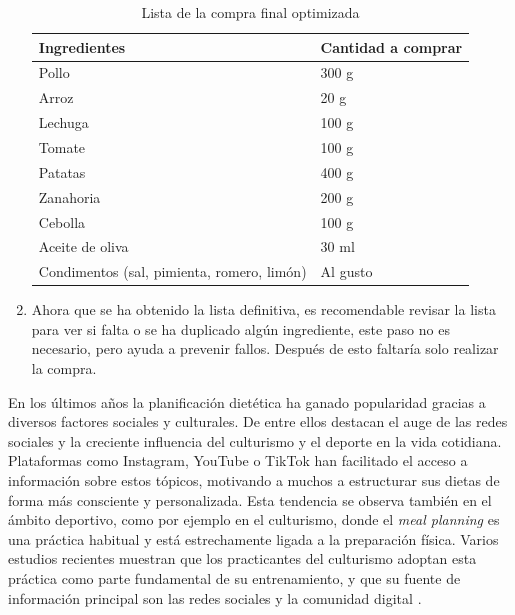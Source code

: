 \documentclass[twoside, openright, 11pt]{report}
\begin{document}
\begin{enumerate}
	  	\begin{table}[H]
	  		\centering			
	  		\label{fig:TablaIngrFinal}
	  		\caption{Lista de la compra final optimizada}
	  		\begin{tabular}{|p{5cm}|p{3cm}|}
	  			\hline
	  			\textbf{Ingredientes} & \textbf{Cantidad a comprar} \\ \hline
	  			Pollo & 300 g \\ \hline
	  			Arroz & 20 g \\ \hline
	  			Lechuga & 100 g \\ \hline
	  			Tomate & 100 g \\ \hline
	  			Patatas & 400 g \\ \hline
	  			Zanahoria & 200 g \\ \hline
	  			Cebolla & 100 g \\ \hline
	  			Aceite de oliva & 30 ml \\ \hline
	  			Condimentos (sal, pimienta, romero, limón) & Al gusto \\ \hline
	  		\end{tabular}
	  	\end{table}
	  	
	  	
	  	
	  	\item Ahora que se ha obtenido la lista definitiva, es recomendable revisar la lista para ver si falta o se ha duplicado algún ingrediente, este paso no es necesario, pero ayuda a prevenir fallos. Después de esto faltaría solo realizar la compra.
	  \end{enumerate}
	  En los últimos años la planificación dietética ha ganado popularidad gracias a diversos factores sociales y culturales. De entre ellos destacan el auge de las redes sociales y la creciente influencia del culturismo y el deporte en la vida cotidiana. Plataformas como Instagram, YouTube o TikTok han facilitado el acceso a información sobre estos tópicos, motivando a muchos a estructurar sus dietas de forma más consciente y personalizada. Esta tendencia se observa también en el ámbito deportivo, como por ejemplo en el culturismo, donde el \textit{meal planning} es una práctica habitual y está estrechamente ligada a la preparación física. Varios estudios recientes muestran que los practicantes del culturismo adoptan esta práctica como parte fundamental de su entrenamiento, y que su fuente de información principal son las redes sociales y la comunidad digital \cite{helms2019,masoga2021,benjamins2021}.
	  \\	
\end{document}
